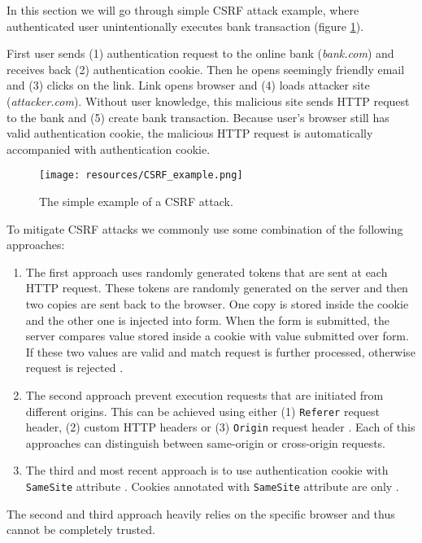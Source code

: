 \documentclass[journal,a4paper,twoside]{template/IEEEtran}
\begin{document}
In this section we will go through simple CSRF attack example, where authenticated user unintentionally executes bank transaction (figure \ref{img_simplecsrfattack}).

First user sends (1) authentication request to the online bank (\textit{bank.com}) and receives back (2) authentication cookie. Then he opens seemingly friendly email and (3) clicks on the link. Link opens browser and (4) loads attacker site (\textit{attacker.com}). Without user knowledge, this malicious site sends HTTP request to the bank and (5) create bank transaction. Because user's browser still has valid authentication cookie, the malicious HTTP request is automatically accompanied with authentication cookie.

\begin{figure}[htb]
\centerline{\texttt{[image: resources/CSRF\_example.png]}}
\caption{The simple example of a CSRF attack.}
\label{img_simplecsrfattack}
\end{figure}

To mitigate CSRF attacks we commonly use some combination of the following approaches:
\begin{enumerate}
    \item The first approach uses randomly generated tokens that are sent at each HTTP request. These tokens are randomly generated on the server and then two copies are sent back to the browser. One copy is stored inside the cookie and the other one is injected into form. When the form is submitted, the server compares value stored inside a cookie with value submitted over form. If these two values are valid and match request is further processed, otherwise request is rejected \cite{li2018mitigating}.
    \item The second approach prevent execution requests that are initiated from different origins. This can be achieved using either (1) \texttt{Referer} request header, (2) custom HTTP headers or (3) \texttt{Origin} request header \cite{barth2008robust,li2018mitigating}. Each of this approaches can distinguish between same-origin or cross-origin requests.
    \item The third and most recent approach is to use authentication cookie with \texttt{SameSite} attribute \cite{Goodwin2018Nov}. Cookies annotated with \texttt{SameSite} attribute are only   .
\end{enumerate}

The second and third approach heavily relies on the specific browser and thus cannot be completely trusted.
\end{document}
